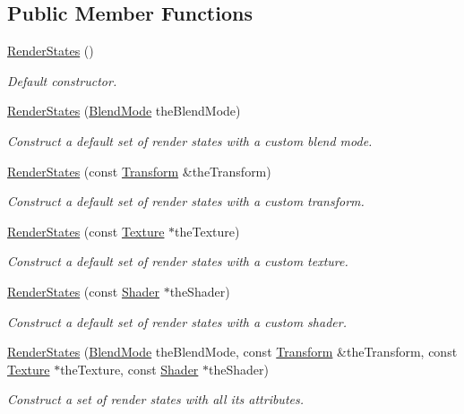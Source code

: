 \subsection*{Public Member Functions}
\begin{DoxyCompactItemize}
\item 
\hyperlink{classsf_1_1_render_states_a885bf14070d0d5391f062f62b270b7d0}{Render\-States} ()
\begin{DoxyCompactList}\small\item\em Default constructor. \end{DoxyCompactList}\item 
\hyperlink{classsf_1_1_render_states_a4e3378a224f67513b95d58184e85210c}{Render\-States} (\hyperlink{group__graphics_ga80c52fe2f7050d7f7573b7ed3c995388}{Blend\-Mode} the\-Blend\-Mode)
\begin{DoxyCompactList}\small\item\em Construct a default set of render states with a custom blend mode. \end{DoxyCompactList}\item 
\hyperlink{classsf_1_1_render_states_a3e99cad6ab05971d40357949930ed890}{Render\-States} (const \hyperlink{classsf_1_1_transform}{Transform} \&the\-Transform)
\begin{DoxyCompactList}\small\item\em Construct a default set of render states with a custom transform. \end{DoxyCompactList}\item 
\hyperlink{classsf_1_1_render_states_a8f4ca3be0e27dafea0c4ab8547439bb1}{Render\-States} (const \hyperlink{classsf_1_1_texture}{Texture} $\ast$the\-Texture)
\begin{DoxyCompactList}\small\item\em Construct a default set of render states with a custom texture. \end{DoxyCompactList}\item 
\hyperlink{classsf_1_1_render_states_a39f94233f464739d8d8522f3aefe97d0}{Render\-States} (const \hyperlink{classsf_1_1_shader}{Shader} $\ast$the\-Shader)
\begin{DoxyCompactList}\small\item\em Construct a default set of render states with a custom shader. \end{DoxyCompactList}\item 
\hyperlink{classsf_1_1_render_states_ae508c91ac7b8992dc22b8d8a4027ad09}{Render\-States} (\hyperlink{group__graphics_ga80c52fe2f7050d7f7573b7ed3c995388}{Blend\-Mode} the\-Blend\-Mode, const \hyperlink{classsf_1_1_transform}{Transform} \&the\-Transform, const \hyperlink{classsf_1_1_texture}{Texture} $\ast$the\-Texture, const \hyperlink{classsf_1_1_shader}{Shader} $\ast$the\-Shader)
\begin{DoxyCompactList}\small\item\em Construct a set of render states with all its attributes. \end{DoxyCompactList}\end{DoxyCompactItemize}
